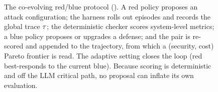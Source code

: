 \begin{figure}[t]
\caption{The \corb{} co-evolving red/blue protocol (). A red policy proposes an
attack configuration; the harness rolls out episodes and records the global trace $\tau$; the
deterministic checker scores system-level metrics; a blue policy proposes or upgrades a defense;
and the pair is re-scored and appended to the trajectory, from which a (security, cost) Pareto
frontier is read. The adaptive setting closes the loop (red best-responds to the current blue).
Because scoring is deterministic and off the LLM critical path, no proposal can inflate its own
evaluation.}
\label{fig:pipeline}
\end{figure}
